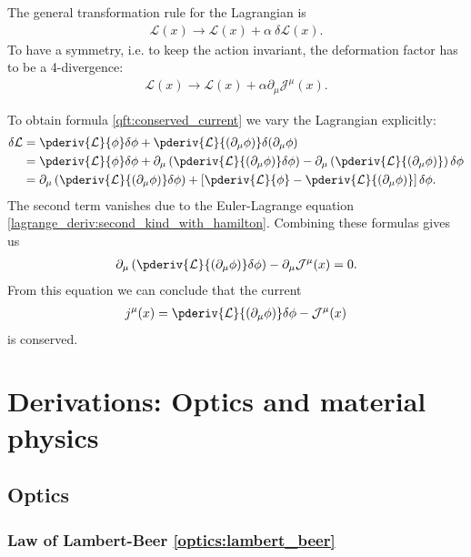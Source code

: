     The general transformation rule for the Lagrangian is
    \begin{gather}
        \label{noether_deriv:1}
        \mathcal{L}(x)\rightarrow\mathcal{L}(x) + \alpha\ \delta\mathcal{L}(x).
    \end{gather}
    To have a symmetry, i.e. to keep the action invariant, the deformation factor has to be a 4-divergence:
    \begin{gather}
        \label{noether_deriv:2}
        \mathcal{L}(x)\rightarrow\mathcal{L}(x) + \alpha\partial_\mu\mathcal{J}^\mu(x).
    \end{gather}

    To obtain formula \ref{qft:conserved_current} we vary the Lagrangian explicitly:
    \begin{align*}
        \delta\mathcal{L} &= \pderiv{\mathcal{L}}{\phi}\delta\phi + \pderiv{\mathcal{L}}{(\partial_\mu\phi)}\delta(\partial_\mu\phi)\\
        &= \pderiv{\mathcal{L}}{\phi}\delta\phi + \partial_\mu\left(\pderiv{\mathcal{L}}{(\partial_\mu\phi)}\delta\phi\right) - \partial_\mu\left(\pderiv{\mathcal{L}}{(\partial_\mu\phi)}\right)\delta\phi\\
        &= \partial_\mu\left(\pderiv{\mathcal{L}}{(\partial_\mu\phi)}\delta\phi\right) + \left[\pderiv{\mathcal{L}}{\phi} - \pderiv{\mathcal{L}}{(\partial_\mu\phi)}\right]\delta\phi.
    \end{align*}
    The second term vanishes due to the Euler-Lagrange equation \ref{lagrange_deriv:second_kind_with_hamilton}. Combining these formulas gives us
    \begin{gather}
        \partial_\mu\left(\pderiv{\mathcal{L}}{(\partial_\mu\phi)}\delta\phi\right) - \partial_\mu\mathcal{J}^\mu(x) = 0.
    \end{gather}
    From this equation we can conclude that the current
    \begin{gather}
        j^\mu(x) = \pderiv{\mathcal{L}}{(\partial_\mu\phi)}\delta\phi - \mathcal{J}^\mu(x)
    \end{gather}
    is conserved.


\chapter{Derivations: Optics and material physics}
\section{Optics}
\subsection{Law of Lambert-Beer \ref{optics:lambert_beer}}

